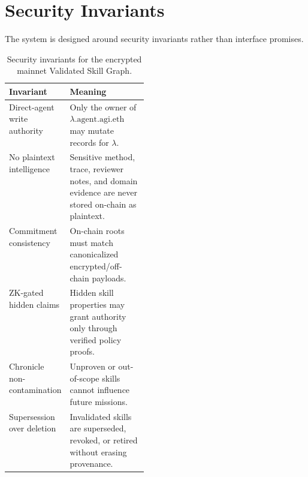 \documentclass[11pt]{article}
\begin{document}
\section{Security Invariants}
The system is designed around security invariants rather than interface promises.

\begin{table}[h]
\centering
\small
\begin{tabularx}{\linewidth}{p{0.27\linewidth}Y}
\toprule
\textbf{Invariant} & \textbf{Meaning} \\
\midrule
Direct-agent write authority & Only the owner of \(\lambda.\mathrm{agent}.\mathrm{agi}.\mathrm{eth}\) may mutate records for \(\lambda\). \\
No plaintext intelligence & Sensitive method, trace, reviewer notes, and domain evidence are never stored on-chain as plaintext. \\
Commitment consistency & On-chain roots must match canonicalized encrypted/off-chain payloads. \\
ZK-gated hidden claims & Hidden skill properties may grant authority only through verified policy proofs. \\
Chronicle non-contamination & Unproven or out-of-scope skills cannot influence future missions. \\
Supersession over deletion & Invalidated skills are superseded, revoked, or retired without erasing provenance. \\
\bottomrule
\end{tabularx}
\caption{Security invariants for the encrypted mainnet Validated Skill Graph.}
\label{tab:invariants}
\end{table}
\end{document}
